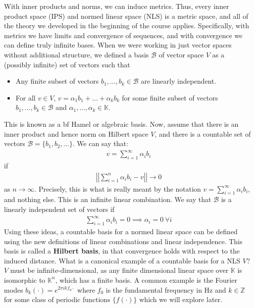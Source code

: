 \documentclass[11pt]{article}
\newcommand{\K}{\ensuremath{\mathbb K}}
\newcommand{\Z}{\ensuremath{\mathbb Z}}
\newcommand{\B}{\ensuremath{\mathcal B}}
\theoremstyle{plain}
\theoremstyle{definition}
\theoremstyle{remark}
\begin{document}
With inner products and norms, we can induce metrics. Thus, every inner product space (IPS) and normed linear space (NLS) is a metric space, and all of the theory we developed in the beginning of the course applies. Specifically, with metrics we have limits and convergence of sequences, and with convergence we can define truly infinite bases. When we were working in just vector spaces without additional structure, we defined a basis $\B$ of vector space $V$ as a (possibly infinite) set of vectors such that
\begin{itemize}
    \item Any finite subset of vectors $b_1, ..., b_k \in \B$ are linearly independent.
    \item For all $v \in V$, $v = \alpha_1b_1 + ... +\alpha_k b_k$ for some finite subset of vectors $b_1, ..., b_k \in \B$ and $\alpha_1, ..., \alpha_k \in \K$.
\end{itemize}
This is known as a {bf Hamel or algebraic basis}. Now, assume that there is an inner product and hence norm on Hilbert space $V$, and there is a countable set of vectors $\B = \{b_1, b_2, ...\}$. We can say that:
\begin{align*}
    v = \sum_{i=1}^\infty \alpha_i b_i 
\end{align*}
if
\begin{align*}
    \left|\left|\sum_{i=1}^n \alpha_i b_i - v\right|\right| \rightarrow 0
\end{align*}
as $n \rightarrow \infty$. Precisely, this is what is really meant by the notation $v = \sum_{i=1}^\infty \alpha_i b_i$, and nothing else. This is an infinite linear combination. We say that $\B$ is a linearly independent set of vectors if
\begin{align*}
    \sum_{i=1}^\infty \alpha_i b_i = 0 \implies \alpha_i = 0 \ \forall i
\end{align*}
Using these ideas, a countable basis for a normed linear space can be defined using the new definitions of linear combinations and linear independence. This basis is called a {\bf Hilbert basis}, in that convergence holds with respect to the induced distance. What is a canonical example of a countable basis for a NLS $V$? $V$ must be infinite-dimensional, as any finite dimensional linear space over $\K$ is isomorphic to $\K^n$, which has a finite basis. A common example is the Fourier modes $b_k(\cdot) = e^{2\pi i k f_0 \cdot}$ where $f_0$ is the fundamental frequency in Hz and $k \in \Z$ for some class of periodic functions $\{f(\cdot)\}$ which we will explore later.
\end{document}
